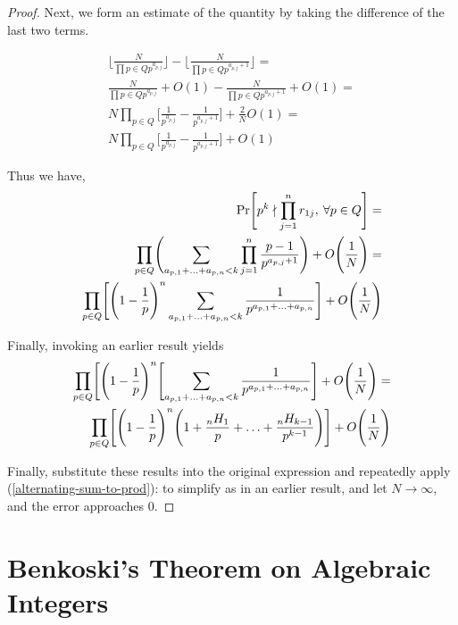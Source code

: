 \documentclass[10pt,a4paper]{article}
\theoremstyle{definition}
\theoremstyle{remark}
\begin{document}
\begin{proof}
		  Next, we form an estimate of the quantity by taking the difference of the last two terms. 
		  
		  \begin{align}
		  	\Biggl\lfloor \frac{N}{\prod {p\in Q} p^{a_{p,j}}} \Biggr\rfloor - \Biggl\lfloor \frac{N}{\prod {p\in Q} p^{a_{p,j}+1}} \Biggr\rfloor =\\
		  	  \frac{N}{\prod {p\in Q} p^{a_{p,j}}} + O(1) -  \frac{N}{\prod {p\in Q} p^{a_{p,j}+1}} + O(1) =\\
		  	   N\prod_ {p\in Q}\Biggl[ \frac{1}{ p^{a_{p,j}}}  -  \frac{1}{ p^{a_{p,j}+1}} \Biggr]+ \frac{2}{N}O(1)=\\
		  	   N\prod_ {p\in Q}\Biggl[ \frac{1}{ p^{a_{p,j}}}  -  \frac{1}{ p^{a_{p,j}+1}} \Biggr]+ O(1)
		  \end{align}
		  
		  Thus we have,
		  \begin{align}
		  	\Pr\Biggl[p^k\nmid \prod_{j=1}^{n}r_{1j},\: \forall p\in Q\Biggr] =\\
		  	 \prod_{p\in Q} \Biggl(\sum_{a_{p,1}+\mathellipsis+a_{p,n}<k}\prod_{j=1}^{n}\frac{p-1}{p^{a_{p,j}+1}}\Biggr)+O\Biggl(\frac{1}{N}\Biggr) = \\
		  	 \prod_{p\in Q}\Biggl[\Biggl(1-\frac{1}{p}\Biggr)^n\sum_{a_{p,1}+\mathellipsis+a_{p,n}<k}\frac{1}{p^{a_{p,1}+\mathellipsis+a_{p,n}}}\Biggr]+O\Biggl(\frac{1}{N}\Biggr)
		  \end{align}
		  
		  Finally, invoking an earlier result yields
		  \begin{align}
		  	\prod_{p\in Q}\Biggl[\Biggl(1-\frac{1}{p}\Biggr)^n\Biggl[\sum_{a_{p,1}+\mathellipsis+a_{p,n}<k}\frac{1}{p^{a_{p,1}+\mathellipsis+a_{p,n}}}\Biggr]+O\Biggl(\frac{1}{N}\Biggr)=\\
		  	 \prod_{p\in Q}\Biggl[\Biggl(1-\frac{1}{p}\Biggr)^n\Biggl(1+\frac{_nH_1}{p}+\mathellipsis+\frac{_nH_{k-1}}{p^{k-1}}\Biggr)\Biggr]+O\Biggl(\frac{1}{N}\Biggr)
		  \end{align}
		  
		  Finally, substitute these results into the original expression and repeatedly apply (\cref{alternating-sum-to-prod}): to simplify as in an earlier result, and let \(N\to \infty\), and the error approaches 0. 
	\end{proof}

\section{Benkoski's Theorem on Algebraic Integers}
\end{document}
